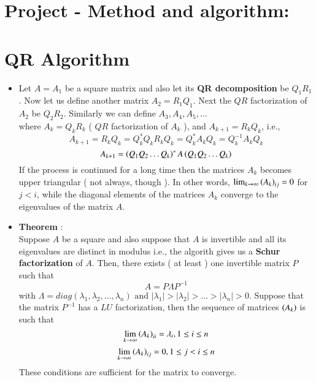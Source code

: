 \documentclass[article]{IEEEtran}
\numberwithin{equation}{enumi}
\numberwithin{figure}{enumi}
\begin{document}
\section{Project - Method and algorithm:}
\section*{QR Algorithm}
		\begin{itemize}
			\item Let $A = A_1$ be a square matrix and also let its \textbf{QR decomposition} be $Q_1 R_1$. Now let us define another matrix $A_2 = R_1 Q_1$. Next the $QR$ factorization of $A_2$ be $Q_2 R_2$. Similarly we can define $A_3, A_4, A_5, \dots $ \\
				where $A_k = Q_k R_k $ ( $QR$ factorization of $A_k$ ), and $A_{k+1} = R_k Q_k$, i.e., \\
				$$ A_{k+1} = R_k Q_k = Q_{k}^{*} Q_k R_k Q_k = Q_{k}^{*} A_k Q_k = Q_{k}^{-1} A_k Q_k $$
				$$ A_{k+1} = \left(Q_1 Q_2 \dots Q_k\right)^{*} A \left(Q_1 Q_2 \dots Q_k\right) $$
				If the process is continued for a long time then the matrices $A_k$ becomes upper triangular ( not always, though ). In other words, $\lim_{k \to \infty} \left(A_k\right)_{ij} = 0$ for $j < i$, while the diagonal elements of the matrices $A_k$ converge to the eigenvalues of the matrix $A$.
			\item \textbf{Theorem} : \\
				Suppose $A$ be a square and also suppose that $A$ is invertible and all its eigenvalues are distinct in modulus i.e., the algorith gives us a \textbf{Schur factorization} of $A$. Then, there exists ( at least ) one invertible matrix $P$ such that 
				$$ A = P \Lambda P^{-1} $$
				with $\Lambda = diag(\lambda_1, \lambda_2, \dots, \lambda_n) \text{ and } |\lambda_1| > |\lambda_2| > \dots > |\lambda_n| > 0 $. Suppose that the matrix $P^{-1}$ has a $LU$ factorization, then the sequence of matrices $\left(A_k\right)$ is such that 
				$$ \lim_{k \to \infty} \left(A_k\right)_{ii} = \lambda_i, 1 \leq i \leq n $$
				$$ \lim_{k \to \infty} \left(A_k\right)_{ij} = 0, 1 \leq j < i \leq n $$
				These conditions are sufficient for the matrix to converge.
		\end{itemize}
\end{document}
